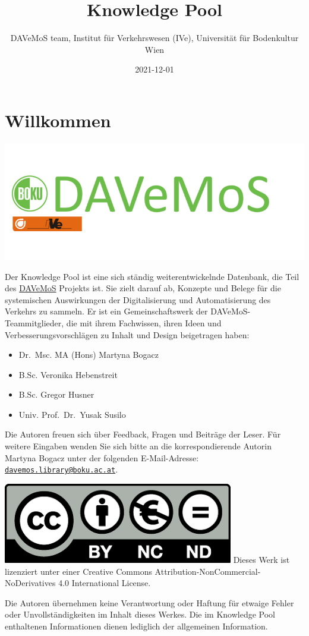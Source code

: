 \documentclass[
]{book}
\title{Knowledge Pool}
\author{DAVeMoS team, Institut für Verkehrswesen (IVe), Universität für Bodenkultur Wien}
\date{2021-12-01}
\providecommand{\tightlist}{%
  \setlength{\itemsep}{0pt}\setlength{\parskip}{0pt}}
\begin{document}
\maketitle

{
\setcounter{tocdepth}{1}
\tableofcontents
}
\hypertarget{willkommen}{%
\chapter*{Willkommen}\label{willkommen}}

\includegraphics[width=0.4\linewidth]{image/davemos_logo}

Der Knowledge Pool ist eine sich ständig weiterentwickelnde Datenbank, die Teil des \href{https://www.davemos.online/}{DAVeMoS} Projekts ist. Sie zielt darauf ab, Konzepte und Belege für die systemischen Auswirkungen der Digitalisierung und Automatisierung des Verkehrs zu sammeln. Er ist ein Gemeinschaftswerk der DAVeMoS-Teammitglieder, die mit ihrem Fachwissen, ihren Ideen und Verbesserungsvorschlägen zu Inhalt und Design beigetragen haben:

\begin{itemize}
\tightlist
\item
  Dr.~Msc. MA (Hons) Martyna Bogacz
\item
  B.Sc. Veronika Hebenstreit
\item
  B.Sc. Gregor Husner
\item
  Univ. Prof.~Dr.~Yusak Susilo
\end{itemize}

Die Autoren freuen sich über Feedback, Fragen und Beiträge der Leser. Für weitere Eingaben wenden Sie sich bitte an die korrespondierende Autorin Martyna Bogacz unter der folgenden E-Mail-Adresse: \href{mailto:davemos.library@boku.ac.at}{\nolinkurl{davemos.library@boku.ac.at}}.

\includegraphics[width=0.1\linewidth]{image/cc}
Dieses Werk ist lizenziert unter einer Creative Commons Attribution-NonCommercial-NoDerivatives 4.0 International License.

Die Autoren übernehmen keine Verantwortung oder Haftung für etwaige Fehler oder Unvollständigkeiten im Inhalt dieses Werkes. Die im Knowledge Pool enthaltenen Informationen dienen lediglich der allgemeinen Information.
\end{document}
